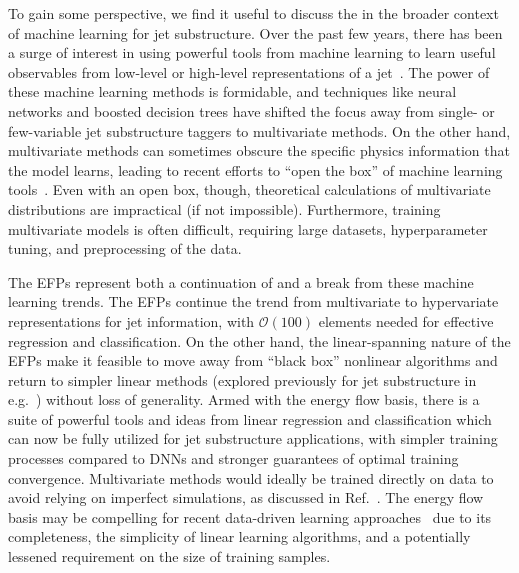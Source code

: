 \documentclass[letterpaper,11pt]{article}
\DeclareRobustCommand{\Ref}[1]{Ref.~\cite{#1}}
\newcommand{\Bs}{\text{EFPs}\xspace}
\begin{document}
To gain some perspective, we find it useful to discuss the \Bs in the broader context of machine learning for jet substructure.
%
Over the past few years, there has been a surge of interest in using powerful tools from machine learning to learn useful observables from low-level or high-level representations of a jet~\cite{Cogan:2014oua,deOliveira:2015xxd,Komiske:2016rsd,Almeida:2015jua,Baldi:2016fql,Kasieczka:2017nvn,Pearkes:2017hku,Butter:2017cot,Aguilar-Saavedra:2017rzt,Guest:2016iqz,Louppe:2017ipp,Datta:2017rhs, Baldi:2014kfa,Baldi:2014pta,Gallicchio:2010dq,Gallicchio:2012ez,Gallicchio:2011xq}.
%
The power of these machine learning methods is formidable, and techniques like neural networks and boosted decision trees have shifted the focus away from single- or few-variable jet substructure taggers to multivariate methods.
%
On the other hand, multivariate methods can sometimes obscure the specific physics information that the model learns, leading to recent efforts to ``open the box'' of machine learning tools~\cite{deOliveira:2015xxd,Butter:2017cot,Chang:2017kvc,Komiske:2017ubm,Metodiev:2018ftz}.
%
Even with an open box, though, theoretical calculations of multivariate distributions are impractical (if not impossible).
%
Furthermore, training multivariate models is often difficult, requiring large datasets, hyperparameter tuning, and preprocessing of the data.

The EFPs represent both a continuation of and a break from these machine learning trends.
%
The EFPs continue the trend from multivariate to hypervariate representations for jet information, with $\mathcal{O}(100)$ elements needed for effective regression and classification.  
%
On the other hand, the linear-spanning nature of the EFPs make it feasible to move away from ``black box'' nonlinear algorithms and return to simpler linear methods (explored previously for jet substructure in e.g.\ \cite{Thaler:2011gf,Cogan:2014oua}) without loss of generality.
%
Armed with the energy flow basis, there is a suite of powerful tools and ideas from linear regression and classification which can now be fully utilized for jet substructure applications, with simpler training processes compared to DNNs and stronger guarantees of optimal training convergence. 
%
Multivariate methods would ideally be trained directly on data to avoid relying on imperfect simulations, as discussed in \Ref{Komiske:2018oaa}.
%
The energy flow basis may be compelling for recent data-driven learning approaches~\cite{Komiske:2018oaa,Dery:2017fap, Metodiev:2017vrx} due to its completeness, the simplicity of linear learning algorithms, and a potentially lessened requirement on the size of training samples.
\end{document}
